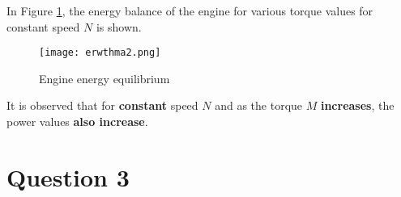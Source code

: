 \documentclass{report}
\begin{document}
In Figure \ref{fig:isolfig}, the energy balance of the engine for various torque values for constant speed $N$ is shown.

\begin{figure}[h]
\centering
\texttt{[image: erwthma2.png]}
\caption{%
Engine energy equilibrium}
\label{fig:isolfig}
\end{figure}

It is observed that for \textbf{constant} speed $N$ and as the torque $M$ \textbf{increases}, the power values \textbf{also increase}.








\section{%
Question 3}








\end{document}
